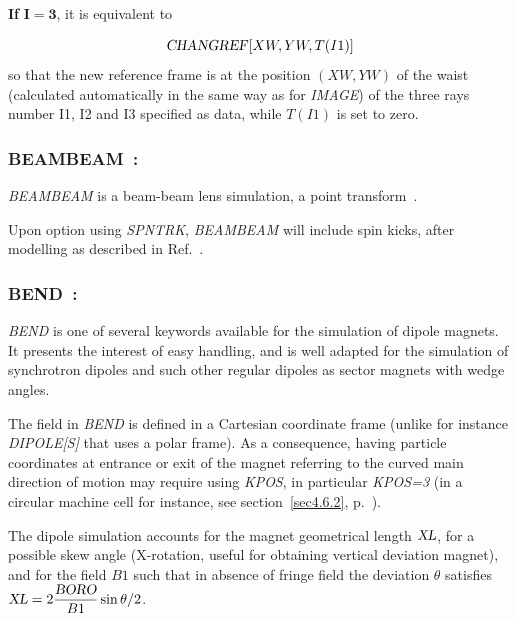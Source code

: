 \bigskip

\noindent\textbf{If} $\mathbf{I=3}$,  it is equivalent to 

$$\text{\textsl{CHANGREF}} \lbrack XW,YW,T(I1)\rbrack $$
%
 so that the new reference frame is at the position $ (XW, YW) $ of
the waist (calculated automatically in the same way as for 
\textsl{IMAGE}) of the three rays number I1, I2 and I3 specified as data,  while $T(I1)$ is set to zero.
 


\newpage


\subsubsection*{BEAMBEAM~: \BEAMBEAMTitl}\label{BEAMBEAM}  
  
\medskip

\textsl{BEAMBEAM} is a beam-beam lens simulation, a point transform~\cite{BBSW}. 

\medskip 

\noindent Upon option using \textsl{SPNTRK}, 
\textsl{BEAMBEAM} will include spin kicks, after  modelling as described in Ref.~\cite{YKBatyginSpin}. 



\newpage


\subsubsection*{BEND~: \BENDTitl}\label{BEND}  
\medskip

\textsl{BEND}  is one of  several keywords available for the
simulation of dipole magnets. It presents the interest of easy handling, and is well adapted for 
the simulation of synchrotron dipoles and such other regular dipoles as sector magnets with wedge 
angles. 

\bigskip

\noindent The field in \textsl{BEND}  is defined in a Cartesian coordinate frame (unlike for instance \textsl{DIPOLE[S]} 
that uses a polar frame).  As a consequence, having particle coordinates at entrance  or exit of the magnet 
referring to the  curved  main direction of motion may 
require using \textsl{KPOS}, in particular \textsl{KPOS=3}  (in a circular machine cell for instance, 
see section~\ref{sec4.6.2}, p.~\pageref{sec4.6.2}). 

\bigskip

\noindent The dipole simulation accounts for the magnet geometrical length $ \textsl{XL} $, for a possible 
 skew angle (X-rotation, useful for obtaining vertical deviation magnet), and for the 
field $ B1 $  such that   in absence of fringe field the deviation $\theta$ satisfies 
$ \textsl{XL} = 2 \dfrac{\textsl{BORO}}{B1} \sin \theta/2$. 

